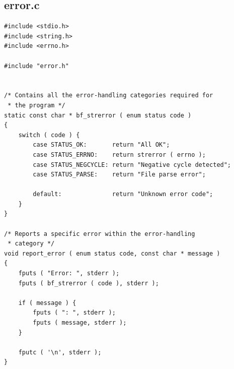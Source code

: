 \documentclass[11pt]{article}
\begin{document}
\subsection{error.c}
\begin{verbatim}
#include <stdio.h>
#include <string.h>
#include <errno.h>

#include "error.h"


/* Contains all the error-handling categories required for
 * the program */
static const char * bf_strerror ( enum status code )
{
    switch ( code ) {
        case STATUS_OK:       return "All OK";
        case STATUS_ERRNO:    return strerror ( errno );
        case STATUS_NEGCYCLE: return "Negative cycle detected";
        case STATUS_PARSE:    return "File parse error";

        default:              return "Unknown error code";
    }
}

/* Reports a specific error within the error-handling
 * category */
void report_error ( enum status code, const char * message )
{
    fputs ( "Error: ", stderr );
    fputs ( bf_strerror ( code ), stderr );

    if ( message ) {
        fputs ( ": ", stderr );
        fputs ( message, stderr );
    }

    fputc ( '\n', stderr );
}
\end{verbatim}
\newpage
\end{document}
